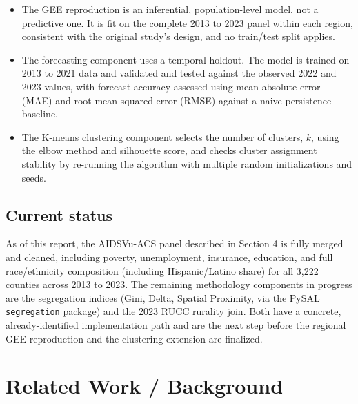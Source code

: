 \documentclass[11pt,letterpaper]{article}
\begin{document}
\begin{itemize}[leftmargin=1.4em]
\item The GEE reproduction is an inferential, population-level model, not a predictive one. It is fit on the complete 2013 to 2023 panel within each region, consistent with the original study's design, and no train/test split applies.
\item The forecasting component uses a temporal holdout. The model is trained on 2013 to 2021 data and validated and tested against the observed 2022 and 2023 values, with forecast accuracy assessed using mean absolute error (MAE) and root mean squared error (RMSE) against a naive persistence baseline.
\item The K-means clustering component selects the number of clusters, $k$, using the elbow method and silhouette score, and checks cluster assignment stability by re-running the algorithm with multiple random initializations and seeds.
\end{itemize}

\subsection{Current status}
As of this report, the AIDSVu-ACS panel described in Section 4 is fully merged and cleaned, including poverty, unemployment, insurance, education, and full race/ethnicity composition (including Hispanic/Latino share) for all 3,222 counties across 2013 to 2023. The remaining methodology components in progress are the segregation indices (Gini, Delta, Spatial Proximity, via the PySAL \texttt{segregation} package) and the 2023 RUCC rurality join. Both have a concrete, already-identified implementation path and are the next step before the regional GEE reproduction and the clustering extension are finalized.

\section{Related Work / Background}
\end{document}
